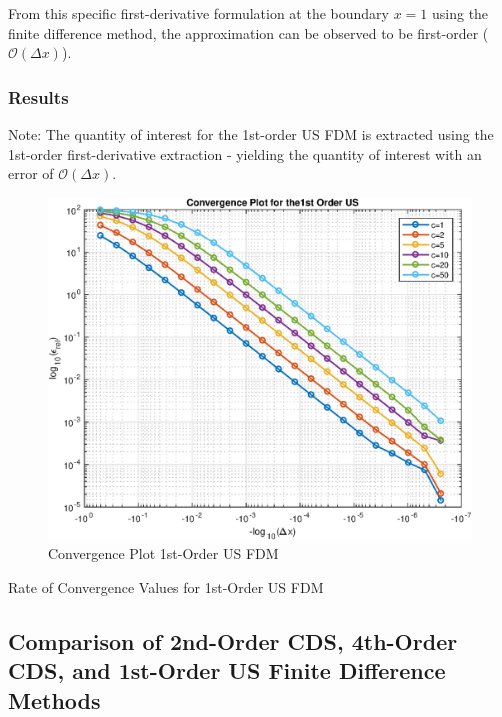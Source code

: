 \documentclass[10pt, reqno]{article}		%
\numberwithin{equation}{section}
\begin{document}
From this specific first-derivative formulation at the boundary $x = 1$ using the finite difference method, the approximation can be observed to be first-order ($\mathcal{O}(\Delta x)$).

\newpage

\subsubsection{Results}

Note: The quantity of interest for the 1st-order US FDM is extracted using the 1st-order first-derivative extraction - yielding the quantity of interest with an error of $\mathcal{O}(\Delta x)$.

\begin{figure}[H]
	\begin{center}
		\includegraphics[width = 0.56\linewidth]{convergence_1st_order_us}
		\caption{Convergence Plot 1st-Order US FDM}	
	\end{center}
\end{figure}

\begin{table}[H]
	
	\caption{Rate of Convergence Values for 1st-Order US FDM}	
\end{table}

\subsection{Comparison of 2nd-Order CDS, 4th-Order CDS, and 1st-Order US Finite Difference Methods}
\end{document}
